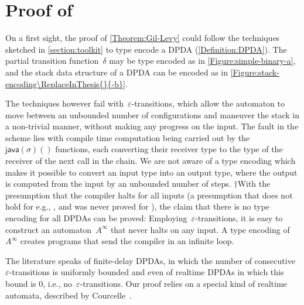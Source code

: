 \documentclass[a4paper,USenglish]{lipics-v2016}
\begin{document}
\section{Proof of }
\label{section:proof}
On a first sight, the proof of \cref{Theorem:Gil-Levy} could follow the techniques
  sketched in \cref{section:toolkit} to type encode a DPDA (\cref{Definition:DPDA}).
The partial transition function~$δ$ may be type encoded as in \cref{Figure:simple-binary-a},
and the stack data structure of a DPDA can be encoded as in \cref{Figure:stack-encoding\ReplaceInThesis{}{-b}}.

The techniques however fail with~$ε$-transitions,
  which allow the automaton to move between an unbounded number of
  configurations and maneuver the stack in a non-trivial manner,
  without making any progress on the input.
The fault in the scheme lies with compile time computation being carried out
  by the~$\textsf{java}(σ)()$ functions, each converting
  their receiver type to the type of the receiver of the next call in the chain.
We are not aware of a \Java type encoding which makes
  it possible to convert an input type into an output type, where
  the output is computed from the input by an unbounded number of steps.
  †{With the presumption that the \Java compiler halts for all inputs (a presumption that does
    not hold for e.g., \CC, and was never proved for \Java), the claim that there is no \Java 
    type encoding for all DPDAs can be proved:
    Employing~$ε$-transitions, it is easy to construct an automaton~$A^∞$ that
    never halts on any input.
    A type encoding of~$A^∞$ creates programs that send the compiler in an infinite loop.
  }

The literature speaks of finite-delay DPDAs, in which the number
  of consecutive~$ε$-transitions is uniformly bounded and even of
  realtime DPDAs in which this bound is 0, i.e., no~$ε$-transitions.
Our proof relies on a special kind of realtime automata,
  described by Courcelle~\cite{Courcelle:77}.
\end{document}
